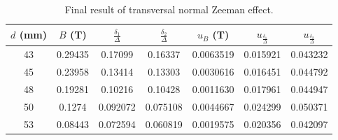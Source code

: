 \documentclass[a4paper,12pt]{article}
\begin{document}
    \begin{table}[H]
        \centering
        \caption{Side product before the final result, where $\delta_{1}$ is the average of 1 and 2 cells, $\delta_{2}$ is the average of 3 and 4 cells, and $\Delta$ is the average of 5 and 6 and 7 cells.Units are all square of pixel }
    \end{table}
    
    \begin{table}[H]
        \centering
        \caption{Final result of transversal normal Zeeman effect.}
        \begin{tabular}{c|c|c|c|c|c|c}
            $d $ (mm)& $B $ (T)& $\frac{\delta_{1}}{\Delta}$ & $\frac{\delta_{2}}{\Delta}$& $u_{B} $ (T)& $u_{\frac{\delta_{1}}{\Delta}} $& $u_{\frac{\delta_{2}}{\Delta}} $ \\ \hline \hline
            43&0.29435&0.17099&0.16337&0.0063519&0.015921&0.043232  \\ \hline
            45&0.23958&0.13414&0.13303&0.0030616&0.016451&0.044792 \\ \hline
            48&0.19281&0.10216&0.10428&0.0011630&0.017961&0.044947  \\ \hline
            50&0.1274&0.092072&0.075108&0.0044667&0.024299&0.050371 \\ \hline        53&0.08443&0.072594&0.060819&0.0019575&0.020356&0.042097 \\ \hline
        \end{tabular}
        \label{tab:tra_nor_final}
    \end{table}
    
\end{document}
